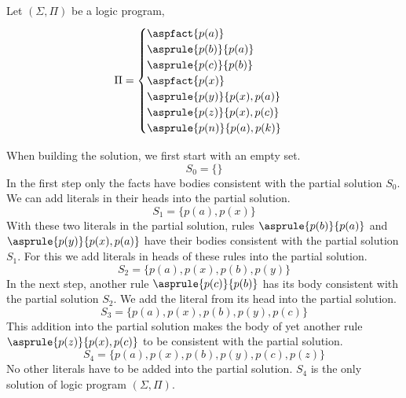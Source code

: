 \begin{example}
    Let $(\Sigma, \Pi)$ be a logic program,
    \begin{equation*}
        \Pi =
            \begin{cases}
                \aspfact{p(a)}\\
                \asprule{p(b)}{p(a)}\\
                \asprule{p(c)}{p(b)}\\
                \aspfact{p(x)}\\
                \asprule{p(y)}{p(x), p(a)}\\
                \asprule{p(z)}{p(x), p(c)}\\
                \asprule{p(n)}{p(a), p(k)}\\
            \end{cases}
    \end{equation*}

    When building the solution, we first start with an empty set.
    \begin{equation*}
        S_0 = \{\}
    \end{equation*}
    In the first step only the facts have bodies consistent with
    the partial solution $S_0$. We can add literals in their heads into
    the partial solution.
    \begin{equation*}
        S_1 = \{p(a), p(x)\}
    \end{equation*}
    With these two literals in the partial solution, rules $\asprule{p(b)}{p(a)}$
    and $\asprule{p(y)}{p(x), p(a)}$ have their bodies consistent
    with the partial solution $S_1$. For this we add literals in heads of these
    rules into the partial solution.
    \begin{equation*}
        S_2 = \{p(a), p(x), p(b), p(y)\}
    \end{equation*}
    In the next step, another rule $\asprule{p(c)}{p(b)}$ has its body consistent
    with the partial solution $S_2$. We add the literal from its head into
    the partial solution.
    \begin{equation*}
        S_3 = \{p(a), p(x), p(b), p(y), p(c)\}
    \end{equation*}
    This addition into the partial solution makes the body of yet another
    rule $\asprule{p(z)}{p(x), p(c)}$ to be consistent with the partial solution.
    \begin{equation*}
        S_4 = \{p(a), p(x), p(b), p(y), p(c), p(z)\}
    \end{equation*}
    No other literals have to be added into the partial solution.
    $S_4$ is the only solution of logic program $(\Sigma, \Pi)$.
\end{example}

